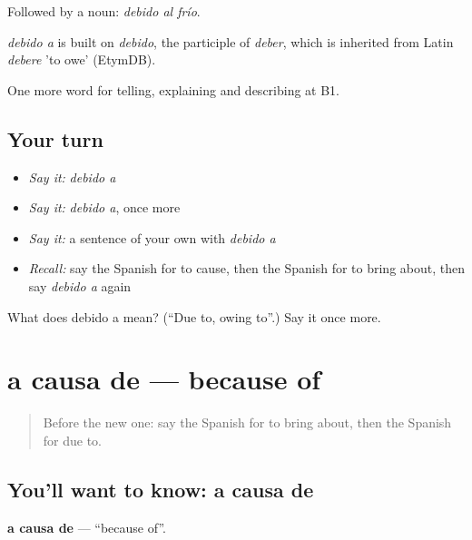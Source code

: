 Followed by a noun: \emph{debido al frío}.

\begin{cousinweb}
\emph{debido a} is built on \emph{debido}, the participle of \emph{deber}, which is inherited from Latin \emph{debere} 'to owe' (EtymDB).
\end{cousinweb}

\begin{grammarlens}[title={What you've built}]
One more word for telling, explaining and describing at B1.
\end{grammarlens}

\subsection*{Your turn}
\begin{itemize}
\raggedright
  \item \emph{Say it:} \emph{debido a}
  \item \emph{Say it:} \emph{debido a}, once more
  \item \emph{Say it:} a sentence of your own with \emph{debido a}
  \item \emph{Recall:} say the Spanish for to cause, then the Spanish for to bring about, then say \emph{debido a} again
\end{itemize}

\begin{tcolorbox}[breakable,colback=teal!4,colframe=teal!35!black,title={Before you move on}]
What does debido a mean? (\textquotedblleft{}Due to, owing to\textquotedblright{}.) Say it once more.
\end{tcolorbox}
\section[a causa de]{a causa de — because of}

\label{lesson:ES-C581-a-causa-de}



\begin{quote}
Before the new one: say the Spanish for to bring about, then the Spanish for due to.
\end{quote}

\subsection*{You'll want to know: a causa de}
\textbf{a causa de} — \textquotedblleft{}because of\textquotedblright{}.

